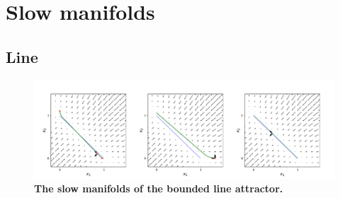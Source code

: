 \documentclass{article}
\newcounter{ct}
\theoremstyle{definition}
\theoremstyle{remark}
\begin{document}
\newpage
\section{Slow manifolds}
\subsection{Line}
\begin{figure}[H]
    \centering
    \includegraphics[width=\textwidth]{figures/bla_slowmanifolds.pdf}
    \caption{\textbf{The slow manifolds of the bounded line attractor.}}
    \label{fig:bla_slowmanifolds}
\end{figure}


\newpage
\end{document}
